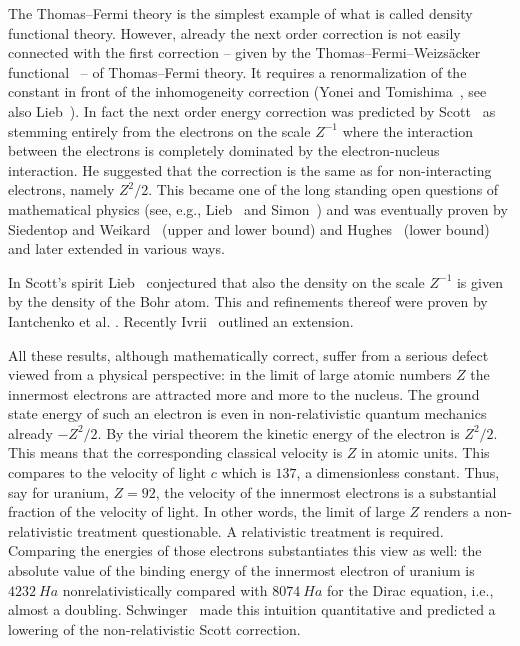 \documentclass[10pt]{amsart}
\theoremstyle{definition}
\begin{document}
The Thomas--Fermi theory is the simplest example of what is called density functional theory. However, already the next order correction is not easily connected with the first correction -- given by the Thomas--Fermi--Weizs\"acker functional~\cite{Weizsacker1935} -- of Thomas--Fermi theory. It requires a renormalization of the constant in front of the inhomogeneity correction (Yonei and Tomishima~\cite{YoneiTomishima1965}, see also Lieb~\cite{Lieb1982A,LiebLiberman1982}). In fact the next order energy correction was predicted by Scott~\cite{Scott1952} as stemming entirely from the electrons on the scale $Z^{-1}$ where the interaction between the electrons is completely dominated by the electron-nucleus interaction. He suggested that the correction is the same as for non-interacting electrons, namely $Z^2/2$. This became one of the long standing open questions of mathematical physics (see, e.g., Lieb~\cite{Lieb1980} and Simon~\cite[Problem~10B]{Simon1984}) and was eventually proven by Siedentop and Weikard~\cite{SiedentopWeikard1986,SiedentopWeikard1987O,SiedentopWeikard1987U,SiedentopWeikard1988,SiedentopWeikard1989} (upper and lower bound) and Hughes~\cite{Hughes1986,Hughes1990} (lower bound) and later extended in various ways.

In Scott's spirit Lieb~\cite{Lieb1981} conjectured that also the density on the scale $Z^{-1}$ is given by the density of the Bohr atom. This and refinements thereof were proven by Iantchenko et al. \cite{Iantchenko1997,Iantchenkoetal1996,IantchenkoSiedentop2001}. Recently Ivrii~\cite{Ivrii2019} outlined an extension.

All these results, although mathematically correct, suffer from a serious defect viewed from a physical perspective: in the limit of large atomic numbers $Z$ the innermost electrons are attracted more and more to the nucleus. The ground state energy of such an electron is even in non-relativistic quantum mechanics already $-Z^2/2$. By the virial theorem the kinetic energy of the electron is $Z^2/2$. This means that the corresponding classical velocity is $Z$ in atomic units. This compares to the velocity of light $c$ which is $137$, a dimensionless constant. Thus, say for uranium, $Z=92$, the velocity of the innermost electrons is a substantial fraction of the velocity of light. In other words, the limit of large $Z$ renders a non-relativistic treatment questionable. A relativistic treatment is required. Comparing the energies of those electrons substantiates this view as well: the absolute value of the binding energy of the innermost electron of uranium is $4232\ Ha$ nonrelativistically compared with $8074\ Ha$ for the Dirac equation, i.e., almost a doubling. Schwinger~\cite{Schwinger1980} made this intuition quantitative and predicted a lowering of the non-relativistic Scott correction.
\end{document}
